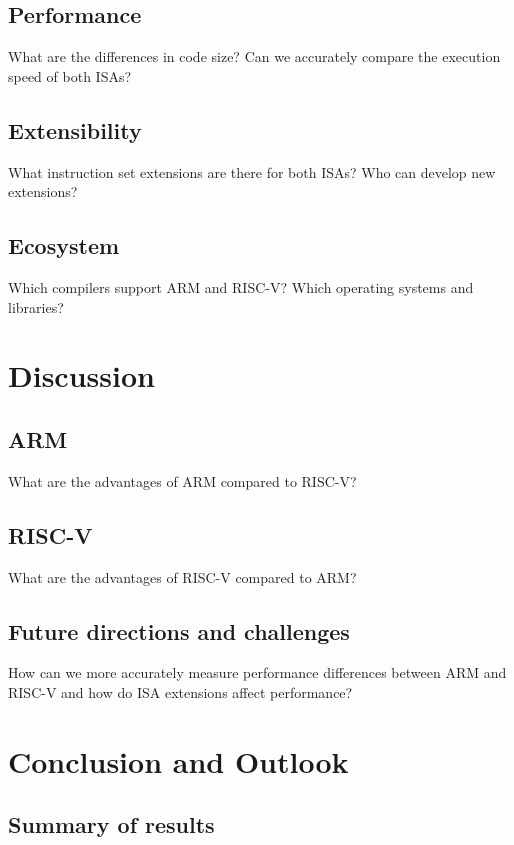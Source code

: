 \documentclass[conference]{IEEEtran}
\begin{document}


	\subsection{Performance}
	What are the differences in code size? Can we accurately compare the execution speed of both ISAs?
	\subsection{Extensibility}\label{sec:extensibility}
	What instruction set extensions are there for both ISAs? Who can develop new extensions?
	\subsection{Ecosystem}
	Which compilers support ARM and RISC-V? Which operating systems and libraries?


\section{Discussion}
\label{ref:discussion}
	\subsection{ARM}
	What are the advantages of ARM compared to RISC-V?
	\subsection{RISC-V}
	What are the advantages of RISC-V compared to ARM?
	\subsection{Future directions and challenges}
	How can we more accurately measure performance differences between ARM and RISC-V and how do ISA extensions affect performance?

\section{Conclusion and Outlook}
\label{ref:conclusion}
	\subsection{Summary of results}
\end{document}

